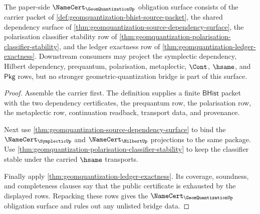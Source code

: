 \begin{theorem}
\label{thm:geomquantization-namecert-obligation-surface}
The paper-side $\NameCert_{\GeomQuantizationUp}$ obligation surface consists of the carrier packet of \autoref{def:geomquantization-bhist-source-packet}, the shared dependency surface of \autoref{thm:geomquantization-source-dependency-surface}, the polarisation classifier stability row of \autoref{thm:geomquantization-polarisation-classifier-stability}, and the ledger exactness row of \autoref{thm:geomquantization-ledger-exactness}. Downstream consumers may project the symplectic dependency, Hilbert dependency, prequantum, polarisation, metaplectic, $\Cont$, $\hsame$, and $\mathsf{Pkg}$ rows, but no stronger geometric-quantization bridge is part of this surface.
\end{theorem}
\begin{proof}
Assemble the carrier first. The definition supplies a finite $\mathsf{BHist}$ packet with the two dependency certificates, the prequantum row, the polarisation row, the metaplectic row, continuation readback, transport data, and provenance.

Next use \autoref{thm:geomquantization-source-dependency-surface} to bind the $\NameCert_{\SymplecticUp}$ and $\NameCert_{\HilbertUp}$ projections to the same package. Use \autoref{thm:geomquantization-polarisation-classifier-stability} to keep the classifier stable under the carried $\hsame$ transports.

Finally apply \autoref{thm:geomquantization-ledger-exactness}. Its coverage, soundness, and completeness clauses say that the public certificate is exhausted by the displayed rows. Repacking these rows gives the $\NameCert_{\GeomQuantizationUp}$ obligation surface and rules out any unlisted bridge data.
\end{proof}

